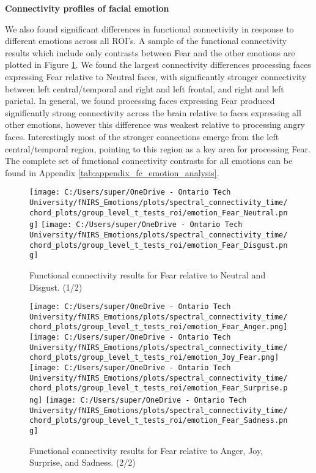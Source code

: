 \noindent
\textbf{Connectivity profiles of facial emotion}

We also found significant differences in functional connectivity in response to different emotions across all ROI's. 
A sample of the functional connectivity results which include only contrasts between Fear and the other emotions are plotted in Figure \ref{fig:fc_emotion_analysis}.
We found the largest connectivity differences processing faces expressing Fear relative to Neutral faces, with significantly stronger connectivity between left central/temporal and right and left frontal, and right and left parietal. 
In general, we found processing faces expressing Fear produced significantly strong connectivity across the brain relative to faces expressing all other emotions, however this difference was weakest relative to processing angry faces. 
Interestingly most of the stronger connections emerge from the left central/temporal region, pointing to this region as a key area for processing Fear. 
The complete set of functional connectivity contrasts for all emotions can be found in Appendix \ref{tab:appendix_fc_emotion_analysis}. 

\begin{figure}[H]
  \centering
  \texttt{[image: C:/Users/super/OneDrive - Ontario Tech University/fNIRS\_Emotions/plots/spectral\_connectivity\_time/chord\_plots/group\_level\_t\_tests\_roi/emotion\_Fear\_Neutral.png]}
  \texttt{[image: C:/Users/super/OneDrive - Ontario Tech University/fNIRS\_Emotions/plots/spectral\_connectivity\_time/chord\_plots/group\_level\_t\_tests\_roi/emotion\_Fear\_Disgust.png]}
  \caption[FC: Emotion Contrasts]{Functional connectivity results for Fear relative to Neutral and Disgust. (1/2)}
  \label{fig:fc_emotion_analysis}
\end{figure}

\FloatBarrier %

\begin{figure}[H]
  \ContinuedFloat
  \centering
  \texttt{[image: C:/Users/super/OneDrive - Ontario Tech University/fNIRS\_Emotions/plots/spectral\_connectivity\_time/chord\_plots/group\_level\_t\_tests\_roi/emotion\_Fear\_Anger.png]}
  \texttt{[image: C:/Users/super/OneDrive - Ontario Tech University/fNIRS\_Emotions/plots/spectral\_connectivity\_time/chord\_plots/group\_level\_t\_tests\_roi/emotion\_Joy\_Fear.png]}
  \texttt{[image: C:/Users/super/OneDrive - Ontario Tech University/fNIRS\_Emotions/plots/spectral\_connectivity\_time/chord\_plots/group\_level\_t\_tests\_roi/emotion\_Fear\_Surprise.png]}
  \texttt{[image: C:/Users/super/OneDrive - Ontario Tech University/fNIRS\_Emotions/plots/spectral\_connectivity\_time/chord\_plots/group\_level\_t\_tests\_roi/emotion\_Fear\_Sadness.png]}
  \caption*{Functional connectivity results for Fear relative to Anger, Joy, Surprise, and Sadness. (2/2)}
\end{figure}

